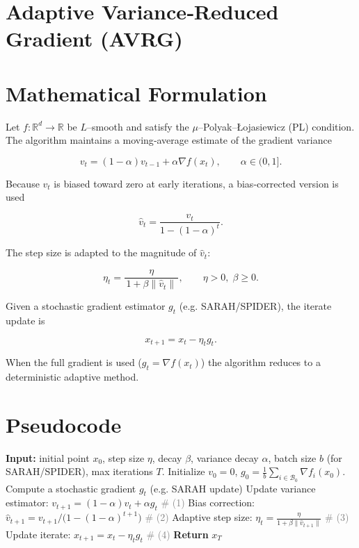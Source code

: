 \documentclass{article}
\newcommand{\RR}{\mathbb{R}}
\begin{document}
\section*{Adaptive Variance‑Reduced Gradient (AVRG)}

\section*{Mathematical Formulation}
Let $f:\RR^{d}\rightarrow\RR$ be $L$–smooth and satisfy the $\mu$–Polyak–Łojasiewicz (PL) condition.  
The algorithm maintains a moving‑average estimate of the gradient variance

\[
\boxed{v_{t}= (1-\alpha)v_{t-1}+ \alpha \nabla f(x_{t})},\qquad \alpha\in(0,1] .
\tag{1}
\]

Because $v_{t}$ is biased toward zero at early iterations, a bias‑corrected version is used

\[
\boxed{\hat v_{t}= \frac{v_{t}}{1-(1-\alpha)^{t}}}.
\tag{2}
\]

The step size is adapted to the magnitude of $\hat v_{t}$:

\[
\boxed{\eta_{t}= \frac{\eta}{\,1+\beta \|\hat v_{t}\|\,}},\qquad \eta>0,\;\beta\ge 0 .
\tag{3}
\]

Given a stochastic gradient estimator $g_{t}$ (e.g. SARAH/SPIDER), the iterate update is

\[
\boxed{x_{t+1}= x_{t}-\eta_{t} g_{t}} .
\tag{4}
\]

When the full gradient is used ($g_{t}=\nabla f(x_{t})$) the algorithm reduces to a deterministic adaptive method.

\section*{Pseudocode}
\begin{algorithm}[H]
\caption{Adaptive Variance‑Reduced Gradient (AVRG)}
\label{alg:avrg}
\begin{algorithmic}[1]
\STATE \textbf{Input:} initial point $x_{0}$, step size $\eta$, decay $\beta$, variance decay $\alpha$, batch size $b$ (for SARAH/SPIDER), max iterations $T$.
\STATE Initialize $v_{0}=0$, $g_{0}= \frac{1}{b}\sum_{i\in\mathcal{B}_{0}}\nabla f_{i}(x_{0})$.
    \STATE Compute a stochastic gradient $g_{t}$ (e.g. SARAH update)
    \STATE Update variance estimator: $v_{t+1}= (1-\alpha)v_{t}+ \alpha g_{t}$ \hfill\textcolor{gray}{\# (1)}
    \STATE Bias correction: $\hat v_{t+1}= v_{t+1}/\bigl(1-(1-\alpha)^{t+1}\bigr)$ \hfill\textcolor{gray}{\# (2)}
    \STATE Adaptive step size: $\displaystyle \eta_{t}= \frac{\eta}{1+\beta \|\hat v_{t+1}\|}$ \hfill\textcolor{gray}{\# (3)}
    \STATE Update iterate: $x_{t+1}= x_{t}-\eta_{t} g_{t}$ \hfill\textcolor{gray}{\# (4)}
\ENDFOR
\STATE \textbf{Return} $x_{T}$
\end{algorithmic}
\end{algorithm}
\end{document}
